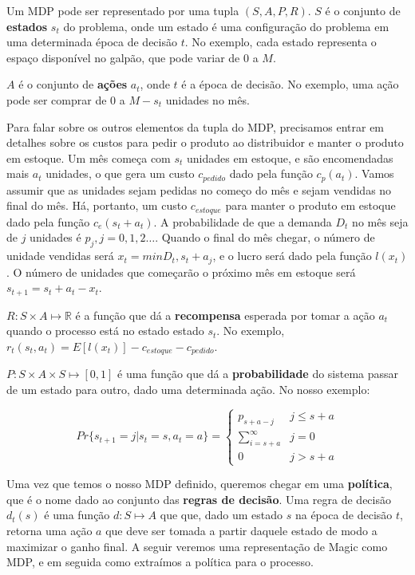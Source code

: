 \documentclass[dvipsnames]{book}
\renewcommand{\le}{\leqslant}
\begin{document}
Um MDP pode ser representado por uma tupla $(S, A, P, R)$. $S$ é o conjunto de \textbf{estados}
$s_t$ do problema, onde um estado é uma configuração do problema em uma determinada época de
decisão $t$. No exemplo, cada estado representa o espaço disponível no galpão, que pode variar
de $0$ a $M$.

$A$ é o conjunto de \textbf{ações} $a_t$, onde $t$ é a época de decisão. No exemplo, uma ação
pode ser comprar de $0$ a $M-s_t$ unidades no mês.

Para falar sobre os outros elementos da tupla do MDP, precisamos entrar em detalhes sobre os
custos para pedir o produto ao distribuidor e manter o produto em estoque. Um mês começa com $s_t$
unidades em estoque, e são encomendadas mais $a_t$ unidades, o que gera um custo $c_{pedido}$ dado
pela função $c_p(a_t)$. Vamos assumir que as unidades sejam pedidas no começo do mês e sejam vendidas
no final do mês. Há, portanto, um custo $c_{estoque}$ para manter o produto em estoque dado pela função
$c_e(s_t + a_t)$. A probabilidade de que a demanda $D_t$ no mês seja de $j$ unidades é $p_j, j = 0,1,2\ldots$.
Quando o final do mês chegar, o número de unidade vendidas será $x_t = min{D_t, s_t + a_j}$, e o lucro
será dado pela função $l(x_t)$. O número de unidades que começarão o próximo mês em estoque será
$s_{t+1}= s_t + a_t - x_t$.

$R: S \times A \mapsto \mathbb{R}$ é a função que dá a \textbf{recompensa} esperada por tomar a ação $a_t$
quando o processo está no estado estado $s_t$. No exemplo, $r_t(s_t, a_t) = E[l(x_t)] - c_{estoque} - c_{pedido}$.

$P: S \times A \times S \mapsto [0,1]$ é uma função que dá a \textbf{probabilidade} do sistema passar de um estado
para outro, dado uma determinada ação. No nosso exemplo:

\begin{equation*}
  Pr\{s_{t+1} = j|s_t = s, a_t = a\} = \begin{cases}p_{s+a-j} &j\le s + a \\
                                                    \sum\limits_{i=s+a}^\infty &j=0 \\
                                                    0 & j >s+a\end{cases}
\end{equation*}

Uma vez que temos o nosso MDP definido, queremos chegar em uma \textbf{política}, que é o nome dado
ao conjunto das \textbf{regras de decisão}. Uma regra de decisão $d_t(s)$ é uma função $d: S \mapsto A$
que que, dado um estado $s$ na época de decisão $t$, retorna uma ação $a$ que deve ser tomada a partir
daquele estado de modo a maximizar o ganho final. A seguir veremos uma representação de Magic como MDP,
e em seguida como extraímos a política para o processo.
\end{document}
